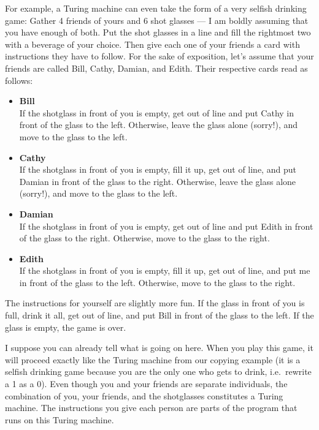For example, a Turing machine can even take the form of a very selfish drinking game:
Gather 4 friends of yours and 6 shot glasses --- I am boldly assuming that you have enough of both.
Put the shot glasses in a line and fill the rightmost two with a beverage of your choice.
Then give each one of your friends a card with instructions they have to follow.
For the sake of exposition, let's assume that your friends are called Bill, Cathy, Damian, and Edith.
Their respective cards read as follows:
%
\begin{itemize}
    \item \textbf{Bill}\\
        If the shotglass in front of you is empty, get out of line and put Cathy in front of the glass to the left.
        Otherwise, leave the glass alone (sorry!), and move to the glass to the left.

    \item \textbf{Cathy}\\
        If the shotglass in front of you is empty, fill it up, get out of line, and put Damian in front of the glass to the right.
        Otherwise, leave the glass alone (sorry!),  and move to the glass to the left.

    \item \textbf{Damian}\\
        If the shotglass in front of you is empty, get out of line and put Edith in front of the glass to the right.
        Otherwise, move to the glass to the right.

    \item \textbf{Edith}\\
        If the shotglass in front of you is empty, fill it up, get out of line, and put me in front of the glass to the left.
        Otherwise, move to the glass to the right.
\end{itemize}
%
The instructions for yourself are slightly more fun.
If the glass in front of you is full, drink it all, get out of line, and put Bill in front of the glass to the left.
If the glass is empty, the game is over.

I suppose you can already tell what is going on here.
When you play this game, it will proceed exactly like the Turing machine from our copying example (it is a selfish drinking game because you are the only one who gets to drink, i.e.~rewrite a 1 as a 0).
Even though you and your friends are separate individuals, the combination of you, your friends, and the shotglasses constitutes a Turing machine.
The instructions you give each person are parts of the program that runs on this Turing machine.

